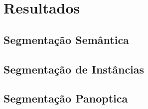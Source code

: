 \newpage
\clearpage

\section{Resultados}
\label{result:result}

\subsection{Segmentação Semântica}
\label{result:semantic}


\subsection{Segmentação de Instâncias}
\label{result:instance}


\subsection{Segmentação Panoptica}
\label{result:panoptic}

